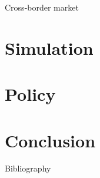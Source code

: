 \documentclass{beamer}
\begin{document}
\begin{frame}{Cross-border market}
    \centering
    \resizebox{\textwidth}{!}{}
\end{frame}


\section{Simulation}

\section{Policy}

\section{Conclusion}




\begin{frame}[allowframebreaks]{Bibliography}
    \printbibliography
\end{frame}
\end{document}
